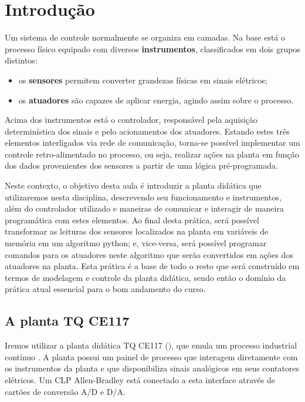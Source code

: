 \section{Introdução}

Um sistema de controle normalmente se organiza em camadas.
%
Na base está o processo físico equipado com diversos \textbf{instrumentos}, classificados em dois grupos distintos:
%
\begin{itemize}
  \item os \textbf{sensores} permitem converter grandezas físicas em sinais elétricos;
  \item os \textbf{atuadores} são capazes de aplicar energia, agindo assim sobre o processo.
\end{itemize}
%
Acima dos instrumentos está o controlador, responsável pela aquisição determinística dos sinais e pelo acionamentos dos atuadores.
%
Estando estes três elementos interligados via rede de comunicação, torna-se possível implementar um controle retro-alimentado no processo, ou seja, realizar ações na planta em função dos dados provenientes dos sensores a partir de uma lógica pré-programada.


Neste contexto, o objetivo desta aula é introduzir a planta didática que utilizaremos nesta disciplina, descrevendo seu funcionamento e instrumentos, além do controlador utilizado e maneiras de comunicar e interagir de maneira programática com estes elementos. 
%
Ao final desta prática, será possível transformar as leituras dos sensores localizados na planta em variáveis de memória em um algoritmo python; e, vice-versa, será possível programar comandos para os atuadores neste algoritmo que serão convertidos em ações dos atuadores na planta.
%
Esta prática é a base de todo o resto que será construído em termos de modelagem e controle da planta didática, sendo então o domínio da prática atual essencial para o bom andamento do curso.


\subsection{A planta TQ CE117}
Iremos utilizar a planta didática TQ CE117 (), que emula um processo industrial contínuo \cite{tecquipment2008}.
%
A planta possui um painel de processo que interagem diretamente com os instrumentos da planta e que disponibiliza sinais analógicos em seus contatores elétricos.
%
Um CLP Allen-Bradley está conectado a esta interface através de cartões de conversão A/D e D/A.



